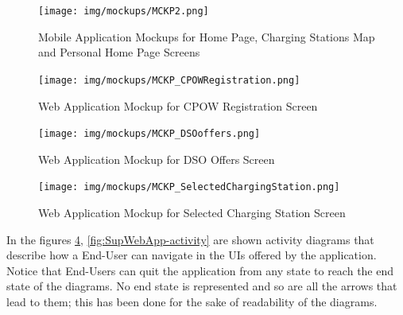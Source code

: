 \documentclass[a4paper]{report}
\begin{document}
\begin{figure}[hp]
\centering
\texttt{[image: img/mockups/MCKP2.png]}
\caption{Mobile Application Mockups for Home Page, Charging Stations Map and Personal Home Page Screens}
\label{fig:MobileApp-activity}
\end{figure}

\begin{figure}[hp]
\centering
\texttt{[image: img/mockups/MCKP\_CPOWRegistration.png]}
\caption{Web Application Mockup for CPOW Registration Screen}
\label{fig:MobileApp-activity}
\end{figure}


\begin{figure}[hp]
\centering
\texttt{[image: img/mockups/MCKP\_DSOoffers.png]}
\caption{Web Application Mockup for DSO Offers Screen}
\label{fig:MobileApp-activity}
\end{figure}


\begin{figure}[hp]
\centering
\texttt{[image: img/mockups/MCKP\_SelectedChargingStation.png]}
\caption{Web Application Mockup for Selected Charging Station Screen}
\label{fig:MobileApp-activity}
\end{figure}

In the figures \ref{fig:MobileApp-activity}, \ref{fig:SupWebApp-activity}  are shown activity diagrams that describe how a End-User can navigate in the UIs offered by the application. Notice that  End-Users can quit the application from any state to reach the end state of the diagrams. No end state is represented and so are all the arrows that lead to them; this has been done for the sake of readability of the diagrams.

\end{document}
